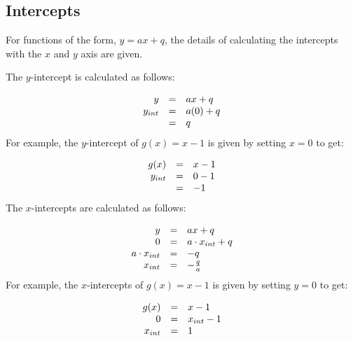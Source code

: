 \subsection*{Intercepts}
\nopagebreak
For functions of the form, $y=ax+q$, the details of calculating the intercepts with the $x$ and $y$ axis are given.\par 
The $y$-intercept is calculated as follows:\par 
\nopagebreak\noindent{}
\begin{equation*}
\begin{array}{ccc}\hfill y& =& ax+q\hfill \\ \hfill {y}_{int}& =& a(0)+q\hfill \\ & =& q\hfill \end{array}
\end{equation*}
For example, the $y$-intercept of $g(x)=x-1$ is given by setting $x=0$ to get:\par 
\nopagebreak\noindent{}
\begin{equation*}
\begin{array}{ccc}\hfill g(x)& =& x-1\hfill \\ \hfill {y}_{int}& =& 0-1\hfill \\ & =& -1\hfill \end{array}
\end{equation*}
The $x$-intercepts are calculated as follows:\par 
\nopagebreak\noindent{}
\begin{equation*}
\begin{array}{ccc}\hfill y& =& ax+q\hfill \\ \hfill 0& =& a\ensuremath{\cdot}{x}_{int}+q\hfill \\ \hfill a\ensuremath{\cdot}{x}_{int}& =& -q\hfill \\ \hfill {x}_{int}& =& -\frac{q}{a}\hfill \end{array}
\end{equation*}
For example, the $x$-intercepts of $g(x)=x-1$ is given by setting $y=0$ to get:\par 
\nopagebreak\noindent{}
\begin{equation*}
\begin{array}{ccc}\hfill g(x)& =& x-1\hfill \\ \hfill 0& =& {x}_{int}-1\hfill \\ \hfill {x}_{int}& =& 1\hfill \end{array}
\end{equation*}

